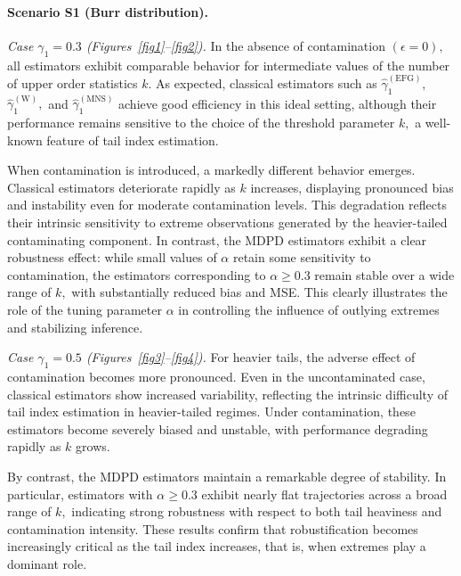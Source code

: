 \documentclass[reqno,openbib,runningheads,a4paper,12pt]{amsart}%
\begin{document}
\paragraph{Scenario S1 (Burr distribution).}

\noindent\emph{Case $\gamma_{1}=0.3$ (Figures~\ref{fig1}--\ref{fig2}).} In the
absence of contamination $\left(  \epsilon=0\right)  ,$ all estimators exhibit
comparable behavior for intermediate values of the number of upper order
statistics $k.$ As expected, classical estimators such as $\widehat{\gamma
}_{1}^{(\mathrm{EFG})},$ $\widehat{\gamma}_{1}^{(\mathrm{W})},$ and
$\widehat{\gamma}_{1}^{(\mathrm{MNS})}$ achieve good efficiency in this ideal
setting, although their performance remains sensitive to the choice of the
threshold parameter $k,$ a well-known feature of tail index
estimation.\smallskip

\noindent When contamination is introduced, a markedly different behavior
emerges. Classical estimators deteriorate rapidly as $k$ increases, displaying
pronounced bias and instability even for moderate contamination levels. This
degradation reflects their intrinsic sensitivity to extreme observations
generated by the heavier-tailed contaminating component. In contrast, the MDPD
estimators exhibit a clear robustness effect: while small values of $\alpha$
retain some sensitivity to contamination, the estimators corresponding to
$\alpha\geq0.3$ remain stable over a wide range of $k,$ with substantially
reduced bias and MSE. This clearly illustrates the role of the tuning
parameter $\alpha$ in controlling the influence of outlying extremes and
stabilizing inference.\smallskip

\noindent\emph{Case $\gamma_{1}=0.5$ (Figures~\ref{fig3}--\ref{fig4}).} For
heavier tails, the adverse effect of contamination becomes more pronounced.
Even in the uncontaminated case, classical estimators show increased
variability, reflecting the intrinsic difficulty of tail index estimation in
heavier-tailed regimes. Under contamination, these estimators become severely
biased and unstable, with performance degrading rapidly as $k$
grows.\smallskip

\noindent By contrast, the MDPD estimators maintain a remarkable degree of
stability. In particular, estimators with $\alpha\geq0.3$ exhibit nearly flat
trajectories across a broad range of $k,$ indicating strong robustness with
respect to both tail heaviness and contamination intensity. These results
confirm that robustification becomes increasingly critical as the tail index
increases, that is, when extremes play a dominant role.
\end{document}
